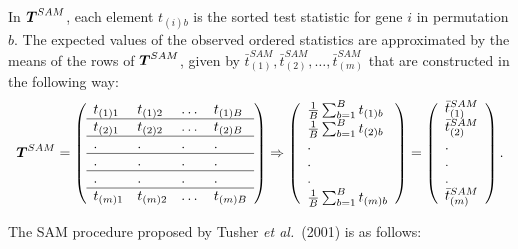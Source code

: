 \documentclass[10pt]{article}
\newcommand{\T}{\mbox{\boldmath $T$}}
\begin{document}
In $\T^{SAM}$, each element $t_{(i)b}$ is the sorted test statistic
for gene $i$ in permutation $b$. The expected values of the observed
ordered statistics are approximated by the means of the rows of
$\T^{SAM}$, given by $\bar{t}_{(1)}^{SAM}, \bar{t}_{(2)}^{SAM},
\dots, \bar{t}_{(m)}^{SAM}$ that are constructed in the following
way:
\[
\T^{SAM}= \left (
\begin{array}{llll}
t_{(1)1} & t_{(1)2} & \dots & t_{(1)B}\\ \hline t_{(2)1}
& t_{(2)2} & \dots & t_{(2)B}\\ \hline .    & . &.      & .
\\ \hline .    & .    &.      & .     \\ \hline . & .    &.      & .
\\ \hline
t_{(m)1} & t_{(m)2} & \dots & t_{(m)B}\\
\end{array}
\right ) \Rightarrow \left (
\begin{array}{l}
\frac{1}{B}\sum_{b=1}^{B}t_{(1)b} \\
\frac{1}{B}\sum_{b=1}^{B}t_{(2)b} \\
.                                     \\
.                                     \\
.                                     \\
\frac{1}{B}\sum_{b=1}^{B}t_{(m)b} \\
\end{array}
\right ) = \left (
\begin{array}{l}
\bar{t}_{(1)}^{SAM} \\
\bar{t}_{(2)}^{SAM} \\
.                                     \\
.                                     \\
.                                     \\
\bar{t}_{(m)}^{SAM} \\
\end{array}
\right ).
\]


The SAM procedure proposed by Tusher \textit{et al.}\ (2001) is as
follows:
\end{document}
